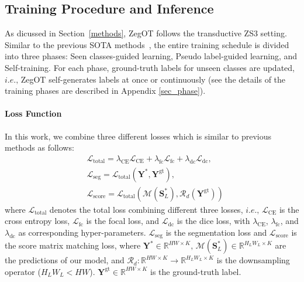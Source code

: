 \documentclass[nohyperref]{article}
\newcommand{\bs}{\boldsymbol}
\newcommand{\asty}{{\mathbf{Y}^*}}
\newcommand{\gty}{\mbf{Y}^{\text{gt}}}
\newcommand{\mbf}{\mathbf}
\theoremstyle{plain}
\theoremstyle{definition}
\theoremstyle{remark}
\begin{document}
\subsection{Training Procedure and Inference}
As dicussed in Section~\ref{methods}, ZegOT follows the transductive ZS3 setting. Similar to the previous SOTA methods~\cite{zhou2022zegclip, zhou2022maskclip}, the entire training schedule is divided into three phases:
Seen classes-guided learning, Pseudo label-guided learning, and Self-training. 
For each phase, ground-truth labels for unseen classes are updated, $\textit{i.e.,}$ ZegOT self-generates labels at once or continuously (see the details of the training phases are described in Appendix \ref{sec_phase}).

\paragraph{Loss Function} \label{sec:loss}
In this work, we combine three different losses which is similar to previous methods as follows:
\begin{align}
&\mathcal{L}_{\text{total}} = \lambda_{\text{CE}} \mathcal{L}_{\text{CE}} + \lambda_{\text{fc}} \mathcal{L}_{\text{fc}} + \lambda_{\text{dc}} \mathcal{L}_{\text{dc}}, 	\\
&\mathcal{L}_{\text{seg}} = \mathcal{L}_{\text{total}}(\asty, \gty), \\
&\mathcal{L}_{\text{score}} = \mathcal{L}_{\text{total}}(\mathcal{M}(\bs{S}^{\ast}_L),\mathcal{R}_{d}(\gty))
\label{losses}
\end{align}
where $\mathcal{L}_{\text{total}}$ denotes the total loss combining different three losses, $\textit{i.e.,}$ $\mathcal{L}_{\text{CE}}$ is the cross entropy loss, $\mathcal{L}_{\text{fc}}$ is the focal loss, and $\mathcal{L}_{\text{dc}}$ is the dice loss, with $\lambda_{\text{CE}}$, $\lambda_{\text{fc}}$, and  $\lambda_{\text{dc}}$ as corresponding hyper-parameters. 
$\mathcal{L}_{\text{seg}}$ is the segmentation loss and $\mathcal{L}_{\text{score}}$ is the score matrix matching loss, where $\asty \in \mathbb{R}^{HW \times K}, \, \mathcal{M}(\bs{S}^*_{L}) \in \mathbb{R}^{H_LW_L\times K}$ are the predictions of our model, and $\mathcal{R}_d:\mathbb{R}^{HW \times K} \rightarrow \mathbb{R}^{H_LW_L \times K}$ is the downsampling operator ($H_LW_L < HW$). $\gty \in \mathbb{R}^{HW \times K}$ is the ground-truth label.
\end{document}
